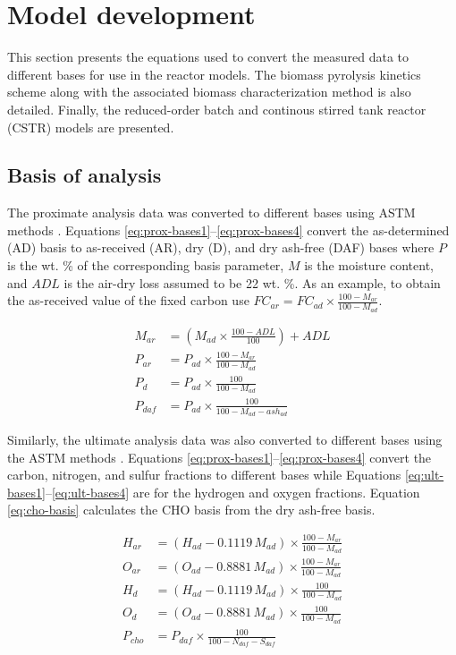 
\section{Model development}

This section presents the equations used to convert the measured data to different bases for use in the reactor models. The biomass pyrolysis kinetics scheme along with the associated biomass characterization method is also detailed. Finally, the reduced-order batch and continous stirred tank reactor (CSTR) models are presented.

\subsection{Basis of analysis}

The proximate analysis data was converted to different bases using ASTM methods \cite{Astm-2015}. Equations \ref{eq:prox-bases1}--\ref{eq:prox-bases4} convert the as-determined (AD) basis to as-received (AR), dry (D), and dry ash-free (DAF) bases where $P$ is the wt. \% of the corresponding basis parameter, $M$ is the moisture content, and $ADL$ is the air-dry loss assumed to be 22 wt. \%. As an example, to obtain the as-received value of the fixed carbon use $FC_{ar} = FC_{ad} \times \frac{100 - M_{ar}}{100 - M_{ad}}$.

\begin{align}
    M_{ar} &= \left(M_{ad} \times \frac{100 - ADL}{100}\right) + ADL \label{eq:prox-bases1} \\
    P_{ar} &= P_{ad} \times \frac{100 - M_{ar}}{100 - M_{ad}} \\
    P_{d} &= P_{ad} \times \frac{100}{100 - M_{ad}} \\
    P_{daf} &= P_{ad} \times \frac{100}{100 - M_{ad} - ash_{ad}} \label{eq:prox-bases4}
\end{align}

Similarly, the ultimate analysis data was also converted to different bases using the ASTM methods \cite{Astm-2015}. Equations \ref{eq:prox-bases1}--\ref{eq:prox-bases4} convert the carbon, nitrogen, and sulfur fractions to different bases while Equations \ref{eq:ult-bases1}--\ref{eq:ult-bases4} are for the hydrogen and oxygen fractions. Equation \ref{eq:cho-basis} calculates the CHO basis from the dry ash-free basis.

\begin{align}
    H_{ar} &= (H_{ad} - 0.1119\, M_{ad}) \times \frac{100 - M_{ar}}{100 - M_{ad}} \label{eq:ult-bases1} \\
    O_{ar} &= (O_{ad} - 0.8881\, M_{ad}) \times \frac{100 - M_{ar}}{100 - M_{ad}} \\
    H_{d} &= (H_{ad} - 0.1119\, M_{ad}) \times \frac{100}{100 - M_{ad}} \\
    O_{d} &= (O_{ad} - 0.8881\, M_{ad}) \times \frac{100}{100 - M_{ad}} \label{eq:ult-bases4} \\
    P_{cho} &= P_{daf} \times \frac{100}{100 - N_{daf} - S_{daf}} \label{eq:cho-basis}
\end{align}

